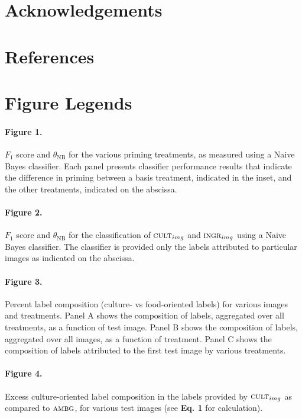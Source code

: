 \documentclass[a4paper]{report}
\begin{document}
\section*{Acknowledgements}
\section*{References}
\begingroup
\renewcommand{\chapter}[2]{}

\endgroup
 

\section*{Figure Legends}
\paragraph{Figure 1.}
$F_1$ score and $\theta_\text{NB}$ for the various 
priming treatments, as measured using a Naive Bayes classifier. Each panel 
presents classifier performance results that indicate the difference in
priming between a basis 
treatment, indicated in the inset, and the other treatments, indicated on the
abscissa.

\paragraph{Figure 2.}
$F_1$ score and $\theta_\text{NB}$ for the classification of 
$\textsc{cult}_{img}$ and $\textsc{ingr}_{img}$ using a Naive Bayes 
classifier.  The classifier is provided only the labels attributed to
particular images as indicated on the abscissa.

\paragraph{Figure 3.}
Percent label composition (culture- vs food-oriented labels) for 
various images and treatments.  Panel A shows the composition of 
labels, aggregated over all treatments, as a function of test image.
Panel B shows the composition of labels, aggregated over all images, as
a function of treatment.  Panel C shows the composition of labels 
attributed to the first test image by various treatments.

\paragraph{Figure 4.}
Excess culture-oriented label composition in the labels provided
by $\textsc{cult}_{img}$ as compared to $\textsc{ambg}$, for various
test images (see \textbf{Eq. 1} for calculation).
\end{document}
